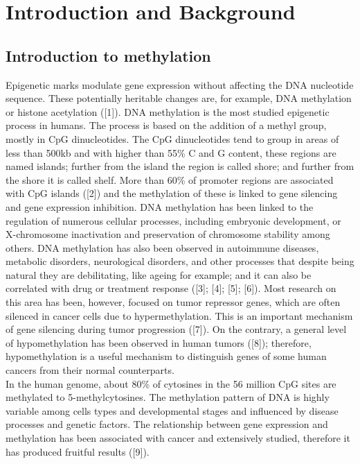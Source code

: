 \documentclass[10pt,letterpaper]{article}
\begin{document}

\linenumbers

\hypertarget{introduction-and-background}{%
\section{Introduction and
Background}\label{introduction-and-background}}

\hypertarget{introduction-to-methylation}{%
\subsection{Introduction to
methylation}\label{introduction-to-methylation}}

Epigenetic marks modulate gene expression without affecting the DNA
nucleotide sequence. These potentially heritable changes are, for
example, DNA methylation or histone acetylation ({[}1{]}). DNA
methylation is the most studied epigenetic process in humans. The
process is based on the addition of a methyl group, mostly in CpG
dinucleotides. The CpG dinucleotides tend to group in areas of less than
500kb and with higher than 55\% C and G content, these regions are named
islands; further from the island the region is called shore; and further
from the shore it is called shelf. More than 60\% of promoter regions
are associated with CpG islands ({[}2{]}) and the methylation of these
is linked to gene silencing and gene expression inhibition. DNA
methylation has been linked to the regulation of numerous cellular
processes, including embryonic development, or X-chromosome inactivation
and preservation of chromosome stability among others. DNA methylation
has also been observed in autoimmune diseases, metabolic disorders,
neurological disorders, and other processes that despite being natural
they are debilitating, like ageing for example; and it can also be
correlated with drug or treatment response ({[}3{]}; {[}4{]}; {[}5{]};
{[}6{]}). Most research on this area has been, however, focused on tumor
repressor genes, which are often silenced in cancer cells due to
hypermethylation. This is an important mechanism of gene silencing
during tumor progression ({[}7{]}). On the contrary, a general level of
hypomethylation has been observed in human tumors ({[}8{]}); therefore,
hypomethylation is a useful mechanism to distinguish genes of some human
cancers from their normal counterparts.\\
In the human genome, about 80\% of cytosines in the 56 million CpG sites
are methylated to 5-methylcytosines. The methylation pattern of DNA is
highly variable among cells types and developmental stages and
influenced by disease processes and genetic factors. The relationship
between gene expression and methylation has been associated with cancer
and extensively studied, therefore it has produced fruitful results
({[}9{]}).
\end{document}
